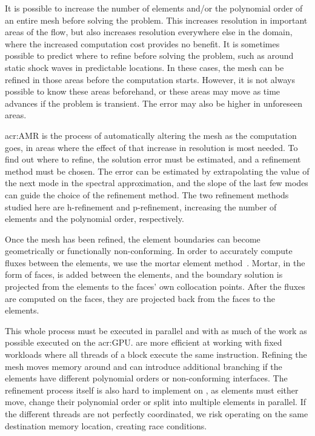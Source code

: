 It is possible to increase the number of elements and/or the polynomial order of an entire mesh
before solving the problem. This increases resolution in important areas of the flow, but also
increases resolution everywhere else in the domain, where the increased computation cost provides no
benefit. It is sometimes possible to predict where to refine before solving the problem, such as
around static shock waves in predictable locations. In these cases, the mesh can be refined in those
areas before the computation starts. However, it is not always possible to know these areas
beforehand, or these areas may move as time advances if the problem is transient. The error may also
be higher in unforeseen areas.

\Acrlong{acr:AMR} is the process of automatically altering the mesh as the computation goes, in
areas where the effect of that increase in resolution is most needed. To find out where to refine,
the solution error must be estimated, and a refinement method must be chosen. The error can be
estimated by extrapolating the value of the next mode in the spectral approximation, and the slope
of the last few modes can guide the choice of the refinement method. The two refinement methods
studied here are h-refinement and p-refinement, increasing the number of elements and the polynomial
order, respectively.

Once the mesh has been refined, the element boundaries can become geometrically or functionally
non-conforming. In order to accurately compute fluxes between the elements, we use the mortar element
method~\cite{Maday1989}. Mortar, in the form of faces, is added between the elements, and the
boundary solution is projected from the elements to the faces' own collocation points. After the
fluxes are computed on the faces, they are projected back from the faces to the elements.

This whole process must be executed in parallel and with as much of the work as possible executed on
the \acrshort{acr:GPU}.  are more efficient at working with fixed workloads
where all threads of a block execute the same instruction. Refining the mesh moves memory around and
can introduce additional branching if the elements have different polynomial orders or
non-conforming interfaces. The refinement process itself is also hard to implement on
, as elements must either move, change their polynomial order or split into
multiple elements in parallel. If the different threads are not perfectly coordinated, we risk
operating on the same destination memory location, creating race conditions.

